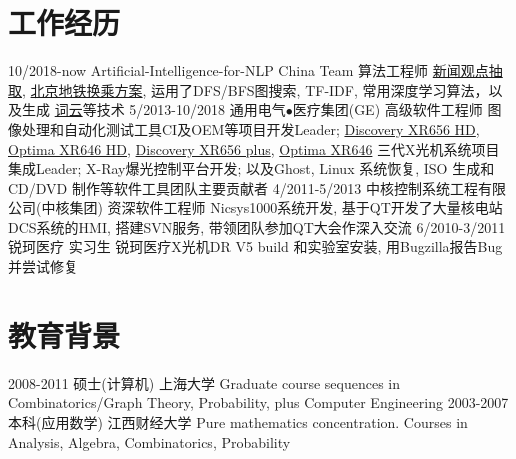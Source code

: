 \documentclass[letterpaper,10pt]{Resume_Liang}
\begin{document}
\begin{body}
\section{工作经历}
\begin{entrylist}
  \entry
    {10/2018-now}
    {Artificial-Intelligence-for-NLP China Team}
    {算法工程师}
    {\href{https://github.com/wangliangster/TestWL/blob/master/ViewPointExtract.ipynb}{新闻观点抽取}, \href{https://github.com/wangliangster/NLP-Course/blob/master/BeijingSubway.ipynb}{北京地铁换乘方案}, 运用了DFS/BFS图搜索, TF-IDF, 常用深度学习算法，以及生成 \href{https://github.com/wangliangster/TestWL/blob/master/wordcloudLiang.ipynb}{词云}等技术 }	
  \entry
    {5/2013-10/2018}
    {通用电气$\bullet$医疗集团(GE)}
    {高级软件工程师}
    {图像处理和自动化测试工具CI及OEM等项目开发Leader; \href{https://www.gehealthcare.com/en/products/radiography/fixed-rad-systems/discovery-xr656-hd-x-ray-system-powered-by-helix}{Discovery XR656 HD}, \href{https://www.gehealthcare.com/en/products/radiography/fixed-rad-systems/optima-xr646-hd-x-ray-system-powered-by-helix}{Optima XR646 HD}, \href{https://www.gehealthcare.com/en/products/radiography/fixed-rad-systems/discovery-xr656-plus}{Discovery XR656 plus}, \href{https://www.gehealthcare.com/en/products/radiography/fixed-rad-systems/optima-xr646}{Optima XR646} 三代X光机系统项目集成Leader; X-Ray爆光控制平台开发; 以及Ghost, Linux 系统恢复, ISO 生成和 CD/DVD 制作等软件工具团队主要贡献者}
  \entry
    {4/2011-5/2013}
    {中核控制系统工程有限公司(中核集团)}
    {资深软件工程师}
    {Nicsys1000系统开发, 基于QT开发了大量核电站DCS系统的HMI, 搭建SVN服务, 带领团队参加QT大会作深入交流}
  \entry
    {6/2010-3/2011}
    {锐珂医疗}
    {实习生}
    {锐珂医疗X光机DR V5 build 和实验室安装, 用Bugzilla报告Bug并尝试修复}
\end{entrylist}


\section{教育背景}
\begin{entrylist}
  \entry
    {2008-2011}
    {硕士(计算机)}
    {上海大学}
    {Graduate course sequences in Combinatorics/Graph Theory, Probability, plus Computer Engineering }
  \entry
    {2003-2007}
    {本科(应用数学)}
    {江西财经大学}
    {Pure mathematics concentration. Courses in Analysis, Algebra, Combinatorics, Probability}
\end{entrylist}



\end{body}
\end{document}
